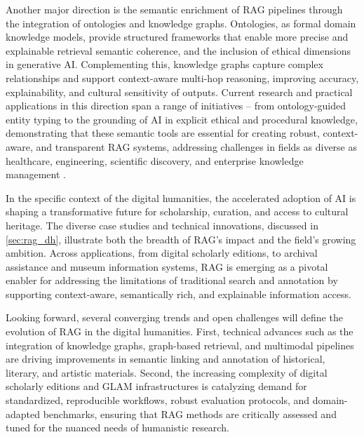 \begin{spacing}{1.5}
Another major direction is the semantic enrichment of RAG pipelines through the integration of ontologies and knowledge graphs. Ontologies, as formal domain knowledge models, provide structured frameworks that enable more precise and explainable retrieval semantic coherence, and the inclusion of ethical dimensions in generative AI. Complementing this, knowledge graphs capture complex relationships and support context-aware multi-hop reasoning, improving accuracy, explainability, and cultural sensitivity of outputs. Current research and practical applications in this direction span a range of initiatives – from ontology-guided entity typing to the grounding of AI in explicit ethical and procedural knowledge, demonstrating that these semantic tools are essential for creating robust, context-aware, and transparent RAG systems, addressing challenges in fields as diverse as healthcare, engineering, scientific discovery, and enterprise knowledge management \citep{tiwari_ontorag_2025, ludwig_ontology-based_2025, bran_ontology-retrieval_2024, sharma_og-rag_2024, xiao_orag_2024, park_ontology-based_2024, debellis_integrating_2024,franco_ontology-based_2020}.

In the specific context of the digital humanities, the accelerated adoption of AI is shaping a transformative future for scholarship, curation, and access to cultural heritage. The diverse case studies and technical innovations, discussed in \autoref{sec:rag_dh}, illustrate both the breadth of RAG’s impact and the field’s growing ambition. Across applications, from digital scholarly editions, to archival assistance and museum information systems, RAG is emerging as a pivotal enabler for addressing the limitations of traditional search and annotation by supporting context-aware, semantically rich, and explainable information access.

Looking forward, several converging trends and open challenges will define the evolution of RAG in the digital humanities. First, technical advances such as the integration of knowledge graphs, graph-based retrieval, and multimodal pipelines are driving improvements in semantic linking and annotation of historical, literary, and artistic materials. Second, the increasing complexity of digital scholarly editions and GLAM infrastructures is catalyzing demand for standardized, reproducible workflows, robust evaluation protocols, and domain-adapted benchmarks, ensuring that RAG methods are critically assessed and tuned for the nuanced needs of humanistic research.


\end{spacing}

